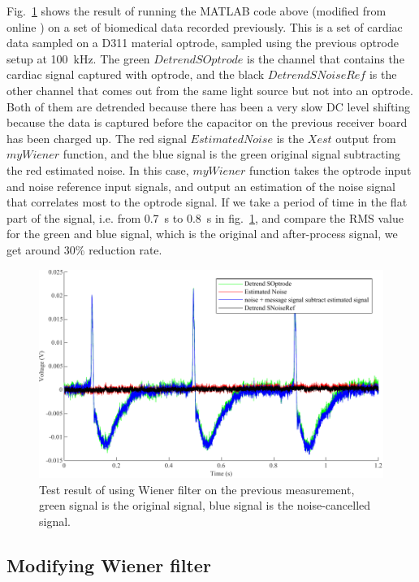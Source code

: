 Fig.~\ref{fig_TestMeasurement} shows the result of running the MATLAB code above (modified from online \cite{MATLABWiener}) on a set of biomedical data recorded previously.  This is a set of cardiac data sampled on a D311 material optrode, sampled using the previous optrode setup at \qty{100}{kHz}.  The green $Detrend SOptrode$ is the channel that contains the cardiac signal captured with optrode, and the black $ Detrend SNoiseRef$ is the other channel that comes out from the same light source but not into an optrode.  Both of them are detrended because there has been a very slow DC level shifting because the data is captured before the capacitor on the previous receiver board has been charged up.  The red signal $Estimated Noise$ is the $Xest$ output from $myWiener$ function, and the blue signal is the green original signal subtracting the red estimated noise.  In this case, $myWiener$ function takes the optrode input and noise reference input signals, and output an estimation of the noise signal that correlates most to the optrode signal.  If we take a period of time in the flat part of the signal, i.e. from \qty{0.7}{s} to \qty{0.8}{s} in fig.~\ref{fig_TestMeasurement}, and compare the RMS value for the green and blue signal, which is the original and after-process signal, we get around 30\% reduction rate.  

\begin{figure}[h]
\centering
\includegraphics[width=1\linewidth]{4-ANC_Sys/TestMeasurement.pdf}
\caption{Test result of using Wiener filter on the previous measurement, green signal is the original signal, blue signal is the noise-cancelled signal.}
\label{fig_TestMeasurement}
\end{figure}

\subsection{Modifying Wiener filter}

